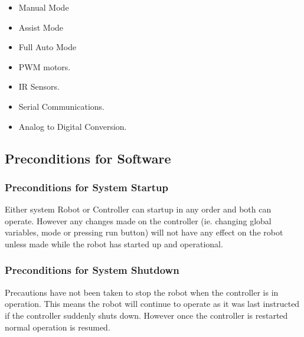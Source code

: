 \documentclass{article}
\begin{document}
\begin{itemize}
	\item Manual Mode
	\item Assist Mode
	\item Full Auto Mode
	\item PWM motors.
	\item IR Sensors.
	\item Serial Communications.
	\item Analog to Digital Conversion.
\end{itemize}

\subsection{Preconditions for Software}
\subsubsection{Preconditions for System Startup}
Either system Robot or Controller can startup in any order and both can operate. However any changes made on the controller (ie. changing global variables, mode or pressing run button) will not have any effect on the robot unless made while the robot has started up and operational.
\subsubsection{Preconditions for System Shutdown}
Precautions have not been taken to stop the robot when the controller is in operation. This means the robot will continue to operate as it was last instructed if the controller suddenly shuts down. However once the controller is restarted normal operation is resumed. 
\end{document}
